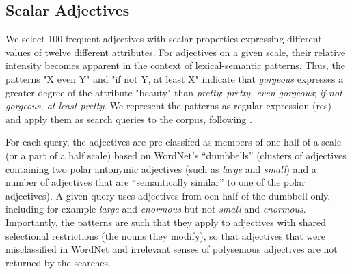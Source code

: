 \documentclass[10pt]{article}
\begin{document}
\subsection{Scalar Adjectives}
We select 100 frequent adjectives with scalar properties expressing different values of twelve different attributes. 
For adjectives on a given scale, their relative intensity becomes apparent in the context of lexical-semantic patterns. 
Thus, the patterns "X even Y" and "if not Y, at least X" indicate that \emph{gorgeous} expresses  a greater degree 
of the attribute "beauty" than \emph{pretty}:  \emph{pretty, even gorgeous}; \emph{if not gorgeous, at least 
pretty}. 
We represent the patterns as regular expression ({\sc re}s) and apply them as search queries to the corpus, following \cite{sheinman2009adjscales}.
 
For each query, the adjectives are pre-classifed as members of one half of a scale (or a part of a half scale) based on WordNet's 
``dumbbells'' (clusters of adjectives containing two polar antonymic adjectives (such as \emph{large} and \emph{small}) and a number of 
adjectives that are ``semantically similar'' to one of the polar adjectives). 
A given query uses adjectives from oen half of the dumbbell only, including for example 
\textit{large} and \textit{enormous} but not \textit{small} and \textit{enormous}. Importantly, the patterns 
are such that they apply to adjectives with shared selectional restrictions (the nouns they modify), 
so that adjectives that  were misclassified in WordNet and irrelevant senses of polysemous adjectives 
are not returned by the searches. 
\end{document}
